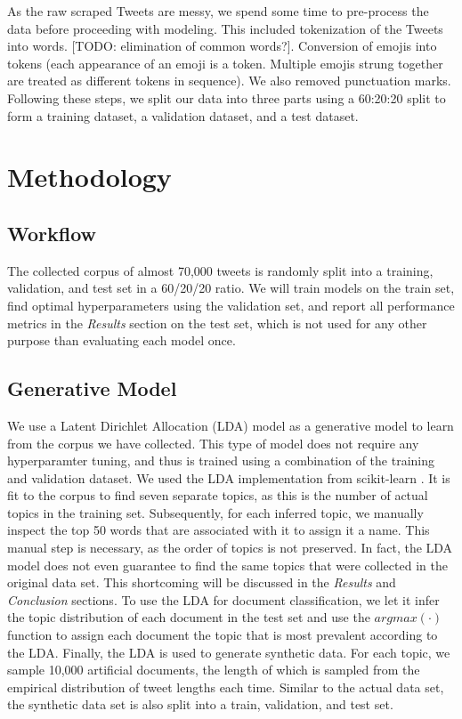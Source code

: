 \documentclass[11pt]{article}
\begin{document}
As the raw scraped Tweets are messy, we spend some time to pre-process the data before proceeding with modeling. This included tokenization of the Tweets into words. [TODO: elimination of common words?]. Conversion of emojis into tokens (each appearance of an emoji is a token. Multiple emojis strung together are treated as different tokens in sequence). We also removed punctuation marks. Following these steps, we split our data into three parts using a 60:20:20 split to form a training dataset, a validation dataset, and a test dataset. 


\noindent 




\section{Methodology}
\subsection{Workflow}
The collected corpus of almost 70,000 tweets is randomly split into a training, validation, and test set in a 60/20/20 ratio. We will train models on the train set, find optimal hyperparameters using the validation set, and report all performance metrics in the \emph{Results} section on the test set, which is not used for any other purpose than evaluating each model once.


\subsection{Generative Model}
We use a Latent Dirichlet Allocation (LDA) model as a generative model to learn from the corpus we have collected. This type of model does not require any hyperparamter tuning, and thus is trained using a combination of the training and validation dataset. We used the LDA implementation from scikit-learn \cite{sklearn}. It is fit to the corpus to find seven separate topics, as this is the number of actual topics in the training set. Subsequently, for each inferred topic, we manually inspect the top 50 words that are associated with it to assign it a name. This manual step is necessary, as the order of topics is not preserved. In fact, the LDA model does not even guarantee to find the same topics that were collected in the original data set. This shortcoming will be discussed in the \emph{Results} and \emph{Conclusion} sections. 
To use the LDA for document classification,  we let it infer the topic distribution of each document in the test set and use the $argmax(\cdot)$ function to assign each document the topic that is most prevalent according to the LDA.
Finally, the LDA is used to generate synthetic data. For each topic, we sample 10,000 artificial documents, the length of which is sampled from the empirical distribution of tweet lengths each time. Similar to the actual data set, the synthetic data set is also split into a train, validation, and test set.
\end{document}
